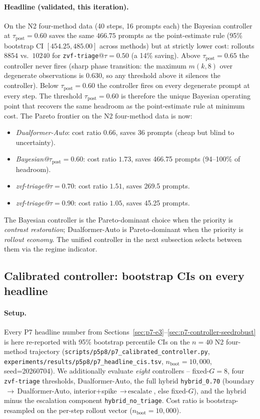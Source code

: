 \paragraph{Headline (validated, this iteration).}
On the N2 four-method data (40 steps, 16 prompts each) the
Bayesian controller at $\tau_{\mathrm{post}}{=}0.60$ saves the
same $466.75$ prompts as the point-estimate rule (95\% bootstrap CI
$[454.25, 485.00]$ across methods) but at strictly lower cost:
rollouts $8854$ vs.\ $10240$ for \texttt{zvf-triage}@$\tau{=}0.50$
(a 14\% saving). Above $\tau_{\mathrm{post}}{=}0.65$ the controller
never fires (sharp phase transition: the maximum $m(k,8)$ over
degenerate observations is $0.630$, so any threshold above it
silences the controller). Below $\tau_{\mathrm{post}}{=}0.60$ the
controller fires on every degenerate prompt at every step. The
threshold $\tau_{\mathrm{post}}{=}0.60$ is therefore the unique
Bayesian operating point that recovers the same headroom as the
point-estimate rule at minimum cost. The Pareto frontier on the
N2 four-method data is now:
\begin{itemize}
\item \emph{Dualformer-Auto}: cost ratio $0.66$, saves 36 prompts (cheap but blind to uncertainty).
\item \emph{Bayesian@$\tau_{\mathrm{post}}{=}0.60$}: cost ratio $1.73$, saves 466.75 prompts (94--100\% of headroom).
\item \emph{zvf-triage@$\tau{=}0.70$}: cost ratio $1.51$, saves 269.5 prompts.
\item \emph{zvf-triage@$\tau{=}0.90$}: cost ratio $1.05$, saves 45.25 prompts.
\end{itemize}
The Bayesian controller is the Pareto-dominant choice when
the priority is \emph{contrast restoration}; Dualformer-Auto is
Pareto-dominant when the priority is \emph{rollout economy}. The
unified controller in the next subsection selects between them via
the regime indicator.

\subsection{Calibrated controller: bootstrap CIs on every headline}
\label{sec:p7-calibrated}
\paragraph{Setup.}
Every P7 headline number from Sections~\ref{sec:p7-e3}--\ref{sec:p7-controller-seedrobust}
is here re-reported with 95\% bootstrap percentile CIs on the
$n{=}40$ N2 four-method trajectory
(\texttt{scripts/p5p8/p7\_calibrated\_controller.py},
\texttt{experiments/results/p5p8/p7\_headline\_cis.tsv},
$n_{\text{boot}}{=}10{,}000$, seed=20260704). We additionally
evaluate \emph{eight} controllers -- fixed-$G{=}8$, four
\texttt{zvf-triage} thresholds, Dualformer-Auto, the full hybrid
\texttt{hybrid\_0.70} (boundary$\,\to\,$Dualformer-Auto,
interior+spike$\,\to\,\text{escalate}$, else fixed-$G$), and the
hybrid minus the escalation component \texttt{hybrid\_no\_triage}.
Cost ratio is bootstrap-resampled on the per-step rollout vector
($n_{\text{boot}}{=}10{,}000$).

